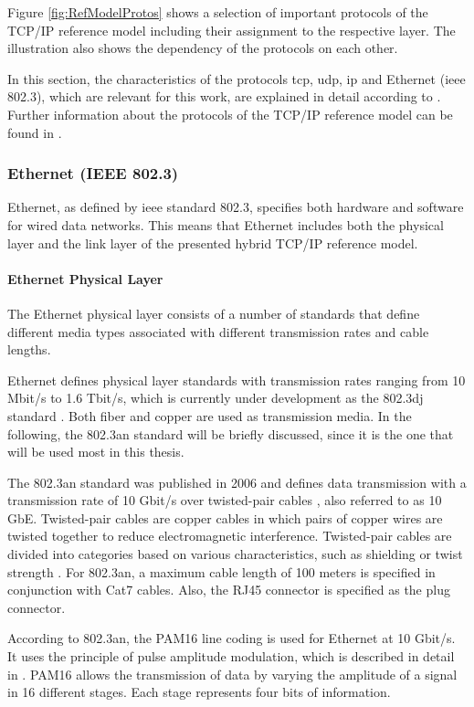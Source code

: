 Figure \ref{fig:RefModelProtos} shows a selection of important protocols of the TCP/IP reference model including their assignment to the respective layer. The illustration also shows the dependency of the protocols on each other.

In this section, the characteristics of the protocols \acs{tcp}, \acs{udp}, \acs{ip} and Ethernet (\acs{ieee} 802.3), which are relevant for this work, are explained in detail according to \cite{Tanenbaum2010}. Further information about the protocols of the TCP/IP reference model can be found in \cite{Tanenbaum2010}.


\subsubsection{Ethernet (IEEE 802.3)}
Ethernet, as defined by \ac{ieee} standard 802.3, specifies both hardware and software for wired data networks.  This means that Ethernet includes both the physical layer and the link layer of the presented hybrid TCP/IP reference model.


\paragraph{Ethernet Physical Layer}
The Ethernet physical layer consists of a number of standards that define different media types associated with different transmission rates and cable lengths. 

Ethernet defines physical layer standards with transmission rates ranging from 10 Mbit/s to 1.6 Tbit/s, which is currently under development as the 802.3dj standard \cite{IEEEOpeningPlenary}. Both fiber and copper are used as transmission media. In the following, the 802.3an standard will be briefly discussed, since it is the one that will be used most in this thesis.

The 802.3an standard was published in 2006 and defines data transmission with a transmission rate of 10 Gbit/s over twisted-pair cables \cite{10GigabitEthernet}, also referred to as 10 GbE. Twisted-pair cables are copper cables in which pairs of copper wires are twisted together to reduce electromagnetic interference. Twisted-pair cables are divided into categories based on various characteristics, such as shielding or twist strength \cite{isoiec11801}. For 802.3an, a maximum cable length of 100 meters is specified in conjunction with Cat7 cables. Also, the RJ45 connector is specified as the plug connector.

According to 802.3an, the PAM16 line coding is used for Ethernet at 10 Gbit/s. It uses the principle of pulse amplitude modulation, which is described in detail in \cite{PulseAmplitudeModulation}. PAM16 allows the transmission of data by varying the amplitude of a signal in 16 different stages. Each stage represents four bits of information.

